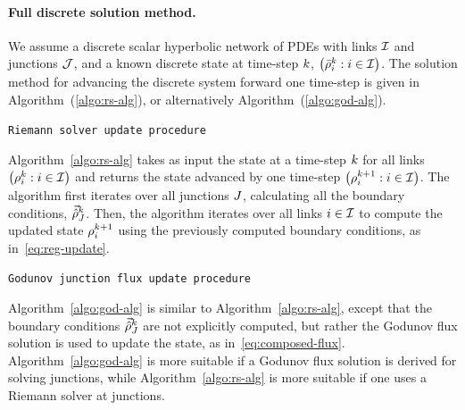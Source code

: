												
												
						\paragraph{Full discrete solution method.\label{par:Full-solution-method}}
												
						We assume a discrete scalar hyperbolic network of PDEs with links
						$\mathcal{I}$ and junctions $\mathcal{J}$, and a known discrete state at time-step
						$k$, $\left(\initdiscrete_{\link}^{\tind}:\link\in\links\right)$.
						The solution method for advancing the discrete system forward one
						time-step is given in Algorithm~(\ref{algo:rs-alg}), or alternatively
						Algorithm~(\ref{algo:god-alg}).
												
						\begin{algorithm}[H]
							\caption{\texttt{Riemann solver update procedure}}
														
														
							
						\end{algorithm}
												
												
						Algorithm~\ref{algo:rs-alg} takes as input the state at a time-step
						$k$ for all links $\left(\discrete{\link}{\tind}:\link\in\links\right)$
						and returns the state advanced by one time-step $\left(\discrete{\link}{\tind+1}:\link\in\links\right)$.
						The algorithm first iterates over all junctions $J$, calculating
						all the boundary conditions, $\vec{\hat{\rho}}_{J}^{k}$. Then, the
						algorithm iterates over all links $i\in\mathcal{I}$ to compute the
						updated state $\rho_{i}^{k+1}$ using the previously computed
						boundary conditions, as in~\eqref{eq:reg-update}.
												
						\begin{algorithm}[h]
							\caption{\texttt{Godunov junction flux update procedure}}
														
														
							
						\end{algorithm}
												
												
						Algorithm~\ref{algo:god-alg} is similar to Algorithm~\ref{algo:rs-alg},
						except that the boundary conditions $\vec{\hat{\rho}}_{J}^{k}$ are
						not explicitly computed, but rather the Godunov flux solution is used
						to update the state, as in~\eqref{eq:composed-flux}. Algorithm~\ref{algo:god-alg}
						is more suitable if a Godunov flux solution is derived for solving
						junctions, while Algorithm~\ref{algo:rs-alg} is more suitable if
						one uses a Riemann solver at junctions.
